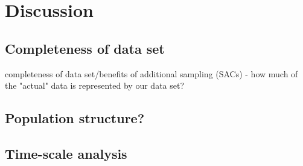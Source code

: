 \section{Discussion}

\subsection{Completeness of data set}

completeness of data set/benefits of additional sampling (SACs)
- how much of the "actual" data is represented by our data set?




\subsection{Population structure?}


\subsection{Time-scale analysis}



